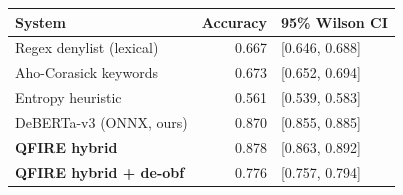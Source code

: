 \begin{tabular}{lrl}
\toprule
System & Accuracy & 95\% Wilson CI \\
\midrule
Regex denylist (lexical) & 0.667 & [0.646, 0.688] \\
Aho-Corasick keywords & 0.673 & [0.652, 0.694] \\
Entropy heuristic & 0.561 & [0.539, 0.583] \\
DeBERTa-v3 (ONNX, ours) & 0.870 & [0.855, 0.885] \\
\textbf{QFIRE hybrid} & 0.878 & [0.863, 0.892] \\
\textbf{QFIRE hybrid + de-obf} & 0.776 & [0.757, 0.794] \\
\bottomrule
\end{tabular}
